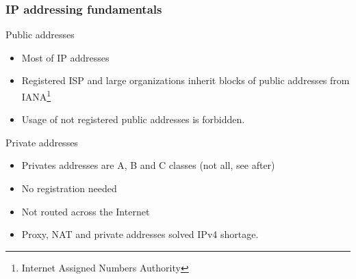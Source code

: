   \begin{frame}
    \frametitle{IP addressing fundamentals}
    \begin{block}{Public addresses}
      \begin{itemize}
        \item Most of IP addresses \pause
        \item Registered ISP and large organizations inherit blocks of public addresses from IANA\footnote{Internet Assigned Numbers Authority} \pause
        \item Usage of not registered public addresses is forbidden.
      \end{itemize}
    \end{block}
    \begin{block}{Private addresses}
      \begin{itemize}
        \item Privates addresses are A, B and C classes (not all, see after)\pause
        \item No registration needed \pause
        \item Not routed across the Internet \pause
        \item Proxy, NAT and private addresses solved IPv4 shortage.
      \end{itemize}
    \end{block}
  \end{frame}

